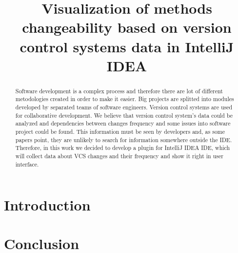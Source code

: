 \documentclass[conference]{IEEEtran}
\begin{document}
\title{Visualization of methods changeability based on version control systems data in IntelliJ IDEA}
\author{
\and
{}
}
\maketitle


\begin{abstract}
Software development is a complex process and therefore there are lot of different metodologies created in order to make it easier. Big projects are splitted into modules developed by separated teams of software engineers. Version control systems are used for collaborative development. We believe that version control system's data could be analyzed and dependencies between changes frequency and some issues into software project could be found. This information must be seen by developers and, as some papers point, they are unlikely to search for information somewhere outside the IDE. Therefore, in this work we decided to develop a plugin for IntelliJ IDEA IDE, which will collect data about VCS changes and their frequency and show it right in user interface. 
\end{abstract}

\IEEEpeerreviewmaketitle



\section{Introduction}


\section{Conclusion}

\nocite{*}
\def\BibTeX{BibTeX}



\end{document}

